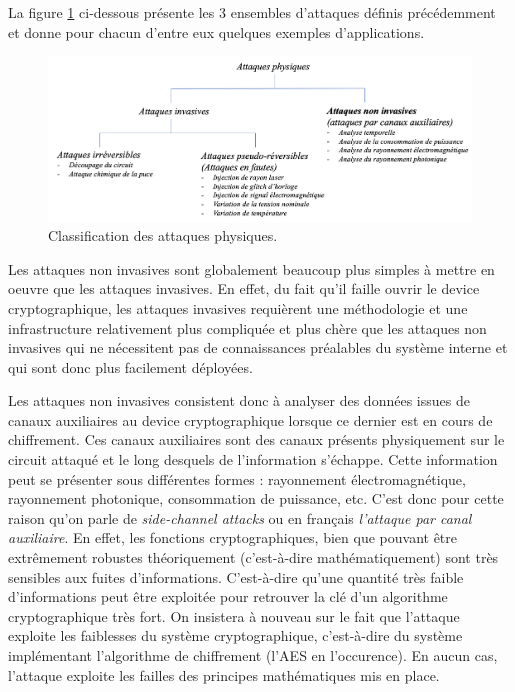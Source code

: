 \documentclass[oneside]{book}
\begin{document}
\hspace{-0.5 cm}La figure \ref{fig:attaques} ci-dessous présente les 3 ensembles d'attaques définis précédemment et donne pour chacun d'entre eux quelques exemples d'applications.
\begin{figure}[htbp]
    \hspace{-1.82 cm}
    \includegraphics[width=1.19\textwidth]{image/attaques}
    \caption{Classification des attaques physiques.}
    \label{fig:attaques}
\end{figure}

\vspace{0.25 cm}Les attaques non invasives sont globalement beaucoup plus simples à mettre en oeuvre que les attaques invasives. En effet, du fait qu'il faille ouvrir le device cryptographique, les attaques invasives requièrent une méthodologie et une infrastructure relativement plus compliquée et plus chère que les attaques non invasives qui ne nécessitent pas de connaissances préalables du système interne et qui sont donc plus facilement déployées. 

\hspace{-0.5 cm}Les attaques non invasives consistent donc à analyser des données issues de canaux auxiliaires au device cryptographique lorsque ce dernier est en cours de chiffrement. Ces canaux auxiliaires sont des canaux présents physiquement sur le circuit attaqué et le long desquels de l’information s’échappe. Cette information peut se présenter sous différentes formes : rayonnement électromagnétique, rayonnement photonique, consommation de puissance, etc. C'est donc pour cette raison qu'on parle de \textit{side-channel attacks} ou en français \textit{l'attaque par canal auxiliaire}. 
En effet, les fonctions cryptographiques, bien que pouvant être extrêmement robustes théoriquement (c'est-à-dire mathématiquement) sont très sensibles aux fuites d’informations. C'est-à-dire qu'une quantité très faible d’informations peut être exploitée pour retrouver la clé d'un algorithme cryptographique très fort. On insistera à nouveau sur le fait que l'attaque exploite les faiblesses du système cryptographique, c'est-à-dire du système implémentant l'algorithme de chiffrement (l'AES en l'occurence). En aucun cas, l'attaque exploite les failles des principes mathématiques mis en place.
\end{document}
